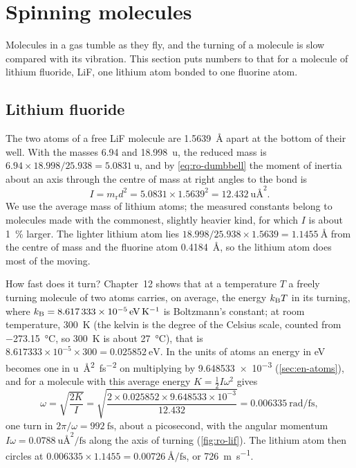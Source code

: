 \section{Spinning molecules}
\label{sec:ro-molecules}

Molecules in a gas tumble as they fly, and the turning of a molecule is
slow compared with its vibration. This section puts numbers to that for
a molecule of lithium fluoride, LiF, one lithium atom bonded to one
fluorine atom.

\subsection*{Lithium fluoride}

The two atoms of a free LiF molecule are \SI{1.5639}{\angstrom} apart at
the bottom of their well\cite{NISTWebBook}. With the masses 6.94 and
\SI{18.998}{\amu}, the reduced mass is $6.94\times18.998/25.938 =
\SI{5.0831}{\amu}$, and by \cref{eq:ro-dumbbell} the moment of inertia
about an axis through the centre of mass at right angles to the bond is
\begin{equation*}
   I = m_{\mathrm r}d^2 = 5.0831\times1.5639^2
   = \SI{12.432}{\amu\angstrom\squared} .
\end{equation*}
We use the average mass of lithium atoms; the measured constants belong
to molecules made with the commonest, slightly heavier kind, for which $I$
is about \SI{1}{\percent} larger.
The lighter lithium atom lies $18.998/25.938\times1.5639 =
\SI{1.1455}{\angstrom}$ from the centre of mass and the fluorine atom
\SI{0.4184}{\angstrom}, so the lithium atom does most of the moving.

How fast does it turn? Chapter~12 shows that at a temperature $T$ a
freely turning molecule of two atoms carries, on average, the energy
$k_{\mathrm{B}} T$ in its turning, where $k_{\mathrm{B}} = \SI{8.617333e-5}{\electronvolt\per
\kelvin}$ is Boltzmann's constant; at room temperature,
\SI{300}{\kelvin} (the kelvin is the degree of the Celsius scale, counted
from \SI{-273.15}{\degreeCelsius}, so \SI{300}{\kelvin} is about
\SI{27}{\degreeCelsius}),
that is $8.617333\times10^{-5}\times300 = \SI{0.025852}{\electronvolt}$. In
the units of atoms an energy in \si{\electronvolt} becomes one in
\si{\amu\angstrom\squared\per\femto\second\squared} on multiplying by
\num{9.648533e-3} (\cref{sec:en-atoms}), and for a molecule with this average energy $K =
\frac12 I\omega^2$ gives
\begin{equation*}
   \omega = \sqrt{\frac{2K}{I}}
   = \sqrt{\frac{2\times0.025852\times9.648533\times10^{-3}}{12.432}}
   = \SI{0.006335}{\radian\per\femto\second} ,
\end{equation*}
one turn in $2\pi/\omega = \SI{992}{\femto\second}$, about a picosecond,
with the angular momentum $I\omega =
\SI{0.0788}{\amu\angstrom\squared\per\femto\second}$ along the axis of
turning (\cref{fig:ro-lif}). The lithium atom then circles at
$0.006335\times1.1455 = \SI{0.00726}{\angstrom\per\femto\second}$, or
\SI{726}{\metre\per\second}.

